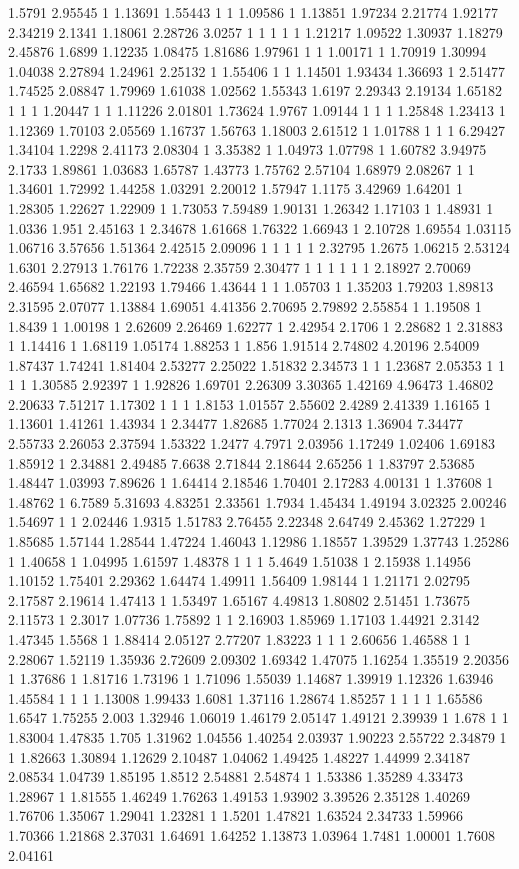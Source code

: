 1.5791 2.95545 1 1.13691 1.55443 1 1 1.09586 1 1.13851 1.97234 2.21774 1.92177 2.34219 2.1341 1.18061 2.28726 3.0257 1 1 1 1 1 1.21217 1.09522 1.30937 1.18279 2.45876 1.6899 1.12235 1.08475 1.81686 1.97961 1 1 1.00171 1 1.70919 1.30994 1.04038 2.27894 1.24961 2.25132 1 1.55406 1 1 1.14501 1.93434 1.36693 1 2.51477 1.74525 2.08847 1.79969 1.61038 1.02562 1.55343 1.6197 2.29343 2.19134 1.65182 1 1 1 1.20447 1 1 1.11226 2.01801 1.73624 1.9767 1.09144 1 1 1 1.25848 1.23413 1 1.12369 1.70103 2.05569 1.16737 1.56763 1.18003 2.61512 1 1.01788 1 1 1 6.29427 1.34104 1.2298 2.41173 2.08304 1 3.35382 1 1.04973 1.07798 1 1.60782 3.94975 2.1733 1.89861 1.03683 1.65787 1.43773 1.75762 2.57104 1.68979 2.08267 1 1 1.34601 1.72992 1.44258 1.03291 2.20012 1.57947 1.1175 3.42969 1.64201 1 1.28305 1.22627 1.22909 1 1.73053 7.59489 1.90131 1.26342 1.17103 1 1.48931 1 1.0336 1.951 2.45163 1 2.34678 1.61668 1.76322 1.66943 1 2.10728 1.69554 1.03115 1.06716 3.57656 1.51364 2.42515 2.09096 1 1 1 1 1 2.32795 1.2675 1.06215 2.53124 1.6301 2.27913 1.76176 1.72238 2.35759 2.30477 1 1 1 1 1 1 2.18927 2.70069 2.46594 1.65682 1.22193 1.79466 1.43644 1 1 1.05703 1 1.35203 1.79203 1.89813 2.31595 2.07077 1.13884 1.69051 4.41356 2.70695 2.79892 2.55854 1 1.19508 1 1.8439 1 1.00198 1 2.62609 2.26469 1.62277 1 2.42954 2.1706 1 2.28682 1 2.31883 1 1.14416 1 1.68119 1.05174 1.88253 1 1.856 1.91514 2.74802 4.20196 2.54009 1.87437 1.74241 1.81404 2.53277 2.25022 1.51832 2.34573 1 1 1.23687 2.05353 1 1 1 1 1.30585 2.92397 1 1.92826 1.69701 2.26309 3.30365 1.42169 4.96473 1.46802 2.20633 7.51217 1.17302 1 1 1 1.8153 1.01557 2.55602 2.4289 2.41339 1.16165 1 1.13601 1.41261 1.43934 1 2.34477 1.82685 1.77024 2.1313 1.36904 7.34477 2.55733 2.26053 2.37594 1.53322 1.2477 4.7971 2.03956 1.17249 1.02406 1.69183 1.85912 1 2.34881 2.49485 7.6638 2.71844 2.18644 2.65256 1 1.83797 2.53685 1.48447 1.03993 7.89626 1 1.64414 2.18546 1.70401 2.17283 4.00131 1 1.37608 1 1.48762 1 6.7589 5.31693 4.83251 2.33561 1.7934 1.45434 1.49194 3.02325 2.00246 1.54697 1 1 2.02446 1.9315 1.51783 2.76455 2.22348 2.64749 2.45362 1.27229 1 1.85685 1.57144 1.28544 1.47224 1.46043 1.12986 1.18557 1.39529 1.37743 1.25286 1 1.40658 1 1.04995 1.61597 1.48378 1 1 1 5.4649 1.51038 1 2.15938 1.14956 1.10152 1.75401 2.29362 1.64474 1.49911 1.56409 1.98144 1 1.21171 2.02795 2.17587 2.19614 1.47413 1 1.53497 1.65167 4.49813 1.80802 2.51451 1.73675 2.11573 1 2.3017 1.07736 1.75892 1 1 2.16903 1.85969 1.17103 1.44921 2.3142 1.47345 1.5568 1 1.88414 2.05127 2.77207 1.83223 1 1 1 2.60656 1.46588 1 1 2.28067 1.52119 1.35936 2.72609 2.09302 1.69342 1.47075 1.16254 1.35519 2.20356 1 1.37686 1 1.81716 1.73196 1 1.71096 1.55039 1.14687 1.39919 1.12326 1.63946 1.45584 1 1 1 1.13008 1.99433 1.6081 1.37116 1.28674 1.85257 1 1 1 1 1.65586 1.6547 1.75255 2.003 1.32946 1.06019 1.46179 2.05147 1.49121 2.39939 1 1.678 1 1 1.83004 1.47835 1.705 1.31962 1.04556 1.40254 2.03937 1.90223 2.55722 2.34879 1 1 1.82663 1.30894 1.12629 2.10487 1.04062 1.49425 1.48227 1.44999 2.34187 2.08534 1.04739 1.85195 1.8512 2.54881 2.54874 1 1.53386 1.35289 4.33473 1.28967 1 1.81555 1.46249 1.76263 1.49153 1.93902 3.39526 2.35128 1.40269 1.76706 1.35067 1.29041 1.23281 1 1.5201 1.47821 1.63524 2.34733 1.59966 1.70366 1.21868 2.37031 1.64691 1.64252 1.13873 1.03964 1.7481 1.00001 1.7608 2.04161 